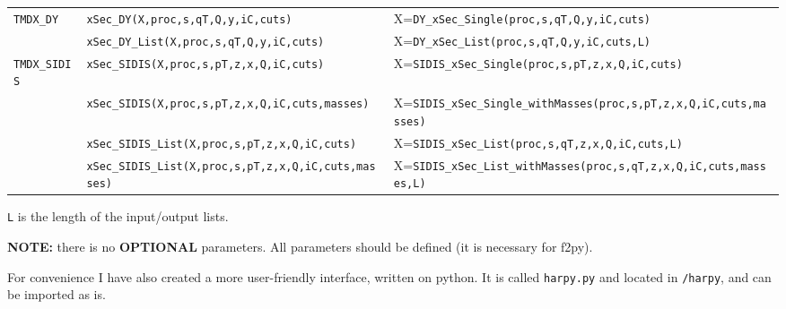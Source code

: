 \documentclass[prd,nofootinbib,eqsecnum,final]{revtex4}
\renewcommand{\(}{\left(}
\renewcommand{\)}{\right)}
\renewcommand{\[}{\left[}
\renewcommand{\]}{\right]}
\newcommand{\red}[1]{{\color[rgb]{1,0,0} #1}}
\begin{document}
\begin{center}
\begin{longtable}{|l|l||p{6cm}|}
\\\hline
\texttt{TMDX\_DY} & \texttt{xSec\_DY(X,proc,s,qT,Q,y,iC,cuts)} & X=\texttt{DY\_xSec\_Single(proc,s,qT,Q,y,iC,cuts)}
\\\cline{2-3}
 & \texttt{xSec\_DY\_List(X,proc,s,qT,Q,y,iC,cuts)} & X=\texttt{DY\_xSec\_List(proc,s,qT,Q,y,iC,cuts,L)}
\\\hline
\texttt{TMDX\_SIDIS} & \texttt{xSec\_SIDIS(X,proc,s,pT,z,x,Q,iC,cuts)} & X=\texttt{SIDIS\_xSec\_Single(proc,s,pT,z,x,Q,iC,cuts)}
\\
\cline{2-3}
& \texttt{xSec\_SIDIS(X,proc,s,pT,z,x,Q,iC,cuts,masses)} & X=\texttt{SIDIS\_xSec\_Single\_withMasses(proc,s,pT,z,x,Q,iC,cuts,masses)}
\\\cline{2-3}
 & \texttt{xSec\_SIDIS\_List(X,proc,s,pT,z,x,Q,iC,cuts)} & X=\texttt{SIDIS\_xSec\_List(proc,s,qT,z,x,Q,iC,cuts,L)}
\\\cline{2-3}
 & \texttt{xSec\_SIDIS\_List(X,proc,s,pT,z,x,Q,iC,cuts,masses)} & X=\texttt{SIDIS\_xSec\_List\_withMasses(proc,s,qT,z,x,Q,iC,cuts,masses,L)}
\end{longtable}
\end{center}
\texttt{L} is the length of the input/output lists.

\red{\textbf{NOTE:} there is no \textbf{OPTIONAL} parameters. All parameters should be defined (it is necessary for f2py).}

\begin{tcolorbox}
For convenience I have also created a more user-friendly interface, written on python. It is called \texttt{harpy.py} and located in \texttt{/harpy}, and can be imported as is.
\end{tcolorbox}

\clearpage
\end{document}
